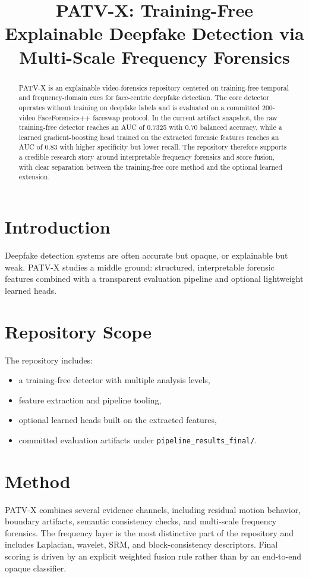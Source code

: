 \documentclass[conference]{IEEEtran}
\title{PATV-X: Training-Free Explainable Deepfake Detection via Multi-Scale Frequency Forensics}
\author{\IEEEauthorblockN{George David Tsitlauri}
\IEEEauthorblockA{\textit{Dept. of Informatics \& Telecommunications}\\
\textit{University of Thessaly, Greece}\\
 gdtsitlauri@gmail.com}}
\begin{document}
\maketitle

\begin{abstract}
PATV-X is an explainable video-forensics repository centered on training-free temporal and frequency-domain cues for face-centric deepfake detection. The core detector operates without training on deepfake labels and is evaluated on a committed 200-video FaceForensics++ faceswap protocol. In the current artifact snapshot, the raw training-free detector reaches an AUC of 0.7325 with 0.70 balanced accuracy, while a learned gradient-boosting head trained on the extracted forensic features reaches an AUC of 0.83 with higher specificity but lower recall. The repository therefore supports a credible research story around interpretable frequency forensics and score fusion, with clear separation between the training-free core method and the optional learned extension.
\end{abstract}

\section{Introduction}
Deepfake detection systems are often accurate but opaque, or explainable but weak. PATV-X studies a middle ground: structured, interpretable forensic features combined with a transparent evaluation pipeline and optional lightweight learned heads.

\section{Repository Scope}
The repository includes:
\begin{itemize}
\item a training-free detector with multiple analysis levels,
\item feature extraction and pipeline tooling,
\item optional learned heads built on the extracted features,
\item committed evaluation artifacts under \texttt{pipeline\_results\_final/}.
\end{itemize}

\section{Method}
PATV-X combines several evidence channels, including residual motion behavior, boundary artifacts, semantic consistency checks, and multi-scale frequency forensics. The frequency layer is the most distinctive part of the repository and includes Laplacian, wavelet, SRM, and block-consistency descriptors. Final scoring is driven by an explicit weighted fusion rule rather than by an end-to-end opaque classifier.
\end{document}
